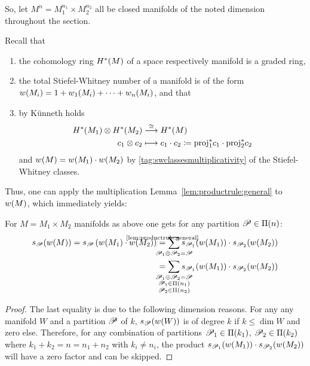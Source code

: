 So, let $M^n=M_1^{n_1}\times M_2^{n_2}$ all be closed manifolds of the
noted dimension throughout the section.

Recall that
\begin{enumerate}
\item the cohomology ring $H^*(M)$ of a space respectively
  manifold is a graded ring,
\item the total Stiefel-Whitney number of a manifold is of the form
  ${w}(M_i) = 1 + {w_{1}}(M_i) + \dotsb + {w_{n}}(M_i)$, and that
\item by Künneth holds
  \begin{align*}
    H^*(M_1)\otimes H^*(M_2)
    &\overset{\cong}{\longrightarrow} H^*(M)
    \\
    c_1 \otimes c_2
    &\longmapsto c_1\cdot c_2
      \coloneqq {\mathrm{proj}}^*_1 c_1 \cdot {\mathrm{proj}}^*_2 c_2
  \end{align*}
  and ${w}(M) = {w}(M_1) \cdot {w}(M_2)$ by
  \ref{tag:swclassesmultiplicativity} of the Stiefel-Whitney classes.
\end{enumerate}
Thus, one can apply the multiplication
Lemma~\autoref{lem:productrule:general} to ${w}(M)$, which immediately
yields:
\begin{Cor}\label{cor:productrule:swcl}
  For $M=M_1\times M_2$ manifolds as above one gets for any partition
  $\mathscr{P}\in\Pi({n})$:
  \begin{align*}
    \s{\Part}(\W{M})
    =
    \s{\Part}\left(\W{M_1}\cdot \W{M_2}\right)
    &\cequalsby{\autoref{lem:productrule:general}}
      \sum_{\mathclap{\Part_1\concat\Part_2=\Part}}
      \s{\Part_1}(\W{M_1}) \cdot \s{\Part_2}(\W{M_2})
    \\ &=
         \sum_{\mathclap{\substack{
         \Part_1\concat\Part_2=\Part\\
    \Part_1\in\PartitionsOf{n_1}\\
    \Part_2\in\PartitionsOf{n_2}\\
    }}}
    \s{\Part_1}(\W{M_1}) \cdot \s{\Part_2}(\W{M_2})
  \end{align*}
  \begin{proof}
    The last equality is due to the following dimension reasons.
    For any any manifold $W$ and a partition $\mathscr{P}$ of $k$,
    $s_{\mathscr{P}}({w}(W))$ is of degree $k$ if $k\leq\dim W$ and zero else.
    Therefore, for any combination of partitions
    $\mathscr{P}_1\in\Pi({k_1})$,
    $\mathscr{P}_2\in\Pi({k_2})$
    where $k_1+k_2=n=n_1+n_2$ with $k_i\neq n_i$, the product
    $s_{\mathscr{P}_1}({w}(M_1))\cdot s_{\mathscr{P}_2}({w}(M_2))$ will have a zero
    factor and can be skipped.
  \end{proof}
\end{Cor}

